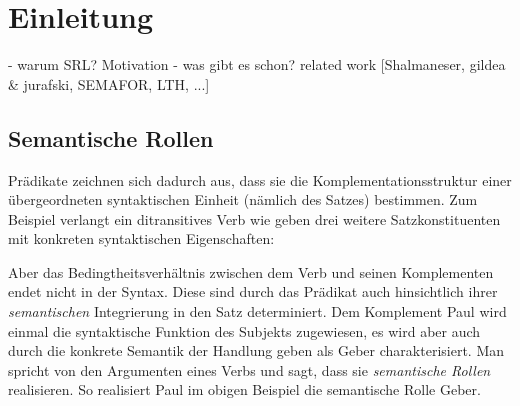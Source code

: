 \documentclass[12pt]{article}
\begin{document}
\pagestyle{fancy} %
\fancyhf{} %
\renewcommand{\headrulewidth}{0pt} %
\renewcommand{\footrulewidth}{0pt} %
\fancyfoot[C]{\thepage} %

 \newpage
 \tableofcontents
 \vspace{1cm}
 \listoffigures
 \vspace{1cm}
 \listoftables

\newpage
{}

\section{Einleitung}
- warum SRL? Motivation
- was gibt es schon? related work
[Shalmaneser, gildea \& jurafski, SEMAFOR, LTH, ...]
\subsection{Semantische Rollen}

Prädikate zeichnen sich dadurch aus, dass sie die Komplementationsstruktur einer
übergeordneten syntaktischen Einheit (nämlich des Satzes) bestimmen. Zum
Beispiel verlangt ein ditransitives Verb wie \glqq{}geben\grqq{} drei weitere Satzkonstituenten mit konkreten syntaktischen Eigenschaften:

\begin{center}
\end{center}

Aber das Bedingtheitsverhältnis zwischen dem Verb und seinen Komplementen 
endet nicht in der Syntax. Diese sind durch das Prädikat auch hinsichtlich ihrer 
\textit{semantischen} Integrierung in den Satz determiniert. Dem Komplement \glqq{}Paul\grqq{}
wird einmal die syntaktische Funktion des Subjekts zugewiesen, es wird aber auch
durch die konkrete Semantik der Handlung \glqq{}geben\grqq{} als 
\glqq{}Geber\grqq{} charakterisiert. Man spricht von den Argumenten
eines Verbs und sagt, dass sie \textit{semantische Rollen} realisieren. So realisiert \glqq{}Paul\grqq{} im obigen Beispiel die semantische Rolle \glqq{}Geber\grqq{}.
\end{document}
